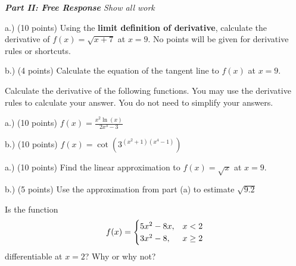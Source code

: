 \documentclass[11pt]{article}
\begin{document}
\begin{questions}
\begin{multiplechoice}{5}
\end{multiplechoice}
\vspace{.2in}

\newpage

\noindent \emph{{\bf Part II: Free Response}{  Show all work}}
\question[14]  

a.) (10 points) Using the \textbf{limit definition of derivative}, calculate the derivative of $f(x) = \sqrt{x + 7}$ at $x = 9$.
No points will be given for derivative rules or shortcuts.
\vspace{4.25in}

b.) (4 points) Calculate the equation of the tangent line to $f(x)$ at $x = 9$.


\newpage


\question[20] Calculate the derivative of the following functions. You may use the derivative rules to calculate
your answer. You do not need to simplify your answers.

a.) (10 points) $\displaystyle f(x) = \frac{x^2 \ln(x)}{2x^3 -3}$
\vspace{3.25in}

b.) (10 points) $\displaystyle f(x) = \cot(3^{(x^2 + 1)(x^4 - 1)})$
\vspace{3.25in}

\newpage

\question[15]  

a.) (10 points) Find the linear approximation to $f(x) = \sqrt{x}$ at $x = 9$.

\vspace{2.25in}

b.) (5 points) Use the approximation from part (a) to estimate $\sqrt{9.2}$

\vspace{1.25in}


\question[15] Is the function
$$\begin{displaystyle}
f(x) = \begin{cases}
5x^2 - 8x, & x < 2 \\
3x^2 - 8, & x \ge 2
\end{cases}
\end{displaystyle}
$$
differentiable at $x = 2$? Why or why not?

\mbox{}
\end{questions}
\end{document}

